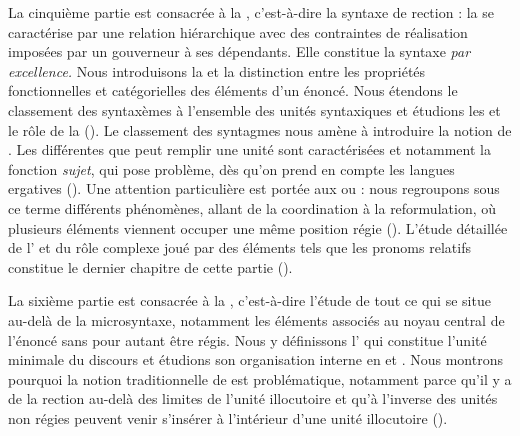 La cinquième partie est consacrée à la , c’est-à-dire la syntaxe de rection : la  se caractérise par une relation hiérarchique avec des contraintes de réalisation imposées par un gouverneur à ses dépendants. Elle constitue la syntaxe \textit{par excellence.} Nous introduisons la  et la distinction entre les propriétés fonctionnelles et catégorielles des éléments d’un énoncé. Nous étendons le classement des syntaxèmes à l’ensemble des unités syntaxiques et étudions les  et le rôle de la  (). Le classement des syntagmes nous amène à introduire la notion de . Les différentes  que peut remplir une unité sont caractérisées et notamment la fonction \textit{sujet}, qui pose problème, dès qu’on prend en compte les langues ergatives (). Une attention particulière est portée aux  ou  : nous regroupons sous ce terme différents phénomènes, allant de la coordination à la reformulation, où plusieurs éléments viennent occuper une même position régie (). L’étude détaillée de l’ et du rôle complexe joué par des éléments tels que les pronoms relatifs constitue le dernier chapitre de cette partie ().

La sixième partie est consacrée à la , c’est-à-dire l’étude de tout ce qui se situe au-delà de la microsyntaxe, notamment les éléments associés au noyau central de l’énoncé sans pour autant être régis. Nous y définissons l’ qui constitue l’unité minimale du discours et étudions son organisation interne en  et . Nous montrons pourquoi la notion traditionnelle de  est problématique, notamment parce qu’il y a de la rection au-delà des limites de l’unité illocutoire et qu’à l’inverse des unités non régies peuvent venir s’insérer à l’intérieur d’une unité illocutoire ().

